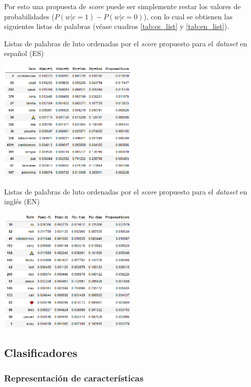 Por esto una propuesta de \textit{score} puede ser simplemente restar los valores de probabilidades ($P(w|c=1) - P(w|c=0)$), con lo cual se obtienen las siguientes listas de palabras (véase cuadros \ref{tab:es_list} y \ref{tab:en_list}).

\begin{table}[H]
    \centering
    \caption{Listas de palabras de luto ordenadas por el \textit{score} propuesto para el \textit{dataset} en español (ES)}
    \includegraphics[width=0.5\textwidth]{doc/images/es_mourning_list.png}
    \label{tab:es_list}
\end{table}

\begin{table}[H]
    \centering
    \caption{Listas de palabras de luto ordenadas por el \textit{score} propuesto para el \textit{dataset} en inglés (EN)}
    \includegraphics[width=0.5\textwidth]{doc/images/en_mourning_list.png}
    \label{tab:en_list}
\end{table}

\subsection{Clasificadores}

\subsubsection{Representación de características}

